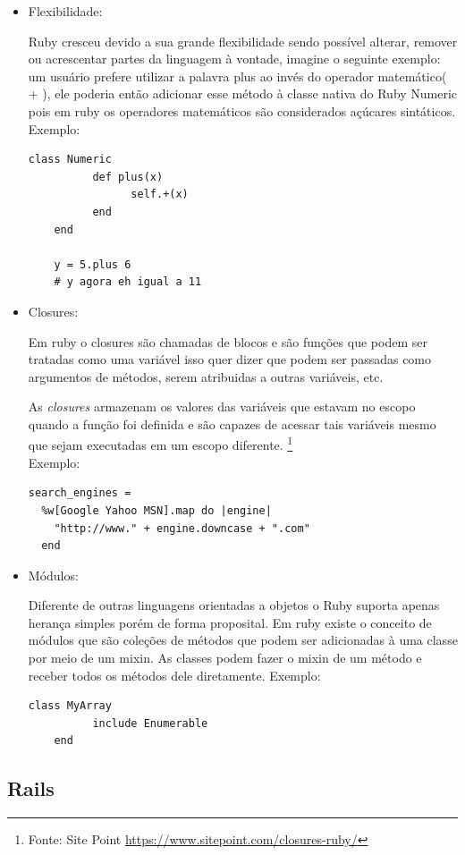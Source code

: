 \begin{itemize}
\item{Flexibilidade:}
    \par Ruby cresceu devido a sua grande flexibilidade sendo possível alterar, remover ou acrescentar partes da linguagem à vontade, imagine o seguinte exemplo: um usuário prefere utilizar a palavra plus ao invés do operador matemático(  +  ), ele poderia então adicionar esse método à classe nativa do Ruby Numeric pois em ruby os operadores matemáticos são considerados açúcares sintáticos.
\\Exemplo:
\begin{lstlisting}[frame=single]
class Numeric
          def plus(x)
                self.+(x)
          end
    end

    y = 5.plus 6
    # y agora eh igual a 11
\end{lstlisting}
\item{Closures:}
    \par Em ruby o closures são chamadas de blocos e são funções que podem ser tratadas como uma variável isso quer dizer que podem ser passadas como argumentos de métodos, serem atribuidas a outras variáveis, etc.
    \par As \emph{closures} armazenam os valores das variáveis que estavam no escopo quando a função foi definida e são capazes de acessar tais variáveis mesmo que sejam executadas em um escopo diferente. \footnote{Fonte: Site Point \url{https://www.sitepoint.com/closures-ruby/}}
\\
Exemplo:
\begin{lstlisting}[frame=single]
search_engines =
  %w[Google Yahoo MSN].map do |engine|
    "http://www." + engine.downcase + ".com"
  end
\end{lstlisting}
\item{Módulos:}
    \par Diferente de outras linguagens orientadas a objetos o Ruby suporta apenas herança simples porém de forma proposital.  Em ruby existe o conceito de módulos que são coleções de métodos que podem ser adicionadas à uma classe por meio de um mixin.
    As classes podem fazer o mixin de um método e receber todos os métodos dele diretamente.
Exemplo:
\begin{lstlisting}[frame=single]
class MyArray
          include Enumerable
    end
\end{lstlisting}

\end{itemize}
\subsection{Rails}

